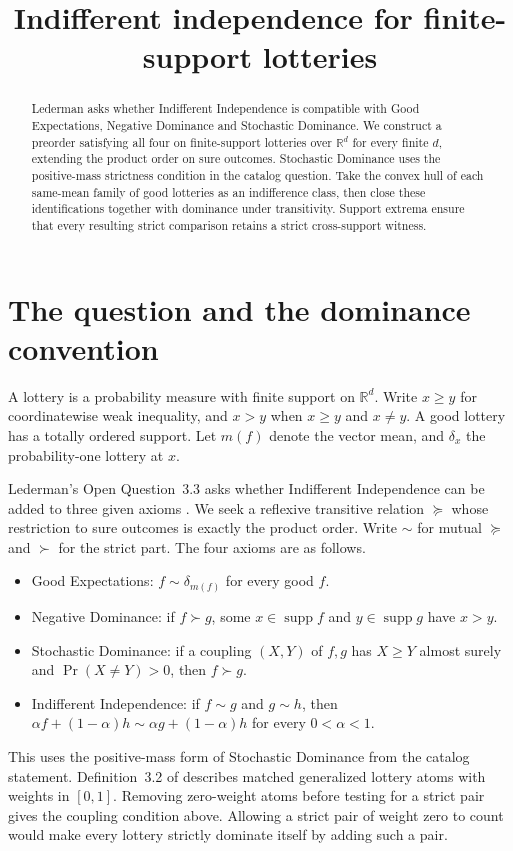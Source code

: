 \documentclass[11pt,a4paper]{amsart}
\title[Indifferent independence for lotteries]{Indifferent independence for finite-support lotteries}
\date{}
\newcommand{\R}{\mathbb R}
\newcommand{\supp}{\operatorname{supp}}
\begin{document}
\begin{abstract}
Lederman asks whether Indifferent Independence is compatible with Good Expectations, Negative Dominance and Stochastic Dominance. We construct a preorder satisfying all four on finite-support lotteries over $\R^d$ for every finite $d$, extending the product order on sure outcomes. Stochastic Dominance uses the positive-mass strictness condition in the catalog question. Take the convex hull of each same-mean family of good lotteries as an indifference class, then close these identifications together with dominance under transitivity. Support extrema ensure that every resulting strict comparison retains a strict cross-support witness.
\end{abstract}
\maketitle

\section{The question and the dominance convention}
A lottery is a probability measure with finite support on $\R^d$. Write $x\ge y$ for coordinatewise weak inequality, and $x>y$ when $x\ge y$ and $x\ne y$. A good lottery has a totally ordered support. Let $m(f)$ denote the vector mean, and $\delta_x$ the probability-one lottery at $x$.

Lederman's Open Question~3.3 asks whether Indifferent Independence can be added to three given axioms \cite[\S3, p.~26]{lederman}. We seek a reflexive transitive relation $\succeq$ whose restriction to sure outcomes is exactly the product order. Write $\sim$ for mutual $\succeq$ and $\succ$ for the strict part. The four axioms are as follows.
\begin{itemize}
\item Good Expectations: $f\sim\delta_{m(f)}$ for every good $f$.
\item Negative Dominance: if $f\succ g$, some $x\in\supp f$ and $y\in\supp g$ have $x>y$.
\item Stochastic Dominance: if a coupling $(X,Y)$ of $f,g$ has $X\ge Y$ almost surely and $\Pr(X\ne Y)>0$, then $f\succ g$.
\item Indifferent Independence: if $f\sim g$ and $g\sim h$, then $\alpha f+(1-\alpha)h\sim\alpha g+(1-\alpha)h$ for every $0<\alpha<1$.
\end{itemize}
This uses the positive-mass form of Stochastic Dominance from the catalog statement. Definition~3.2 of \cite{lederman} describes matched generalized lottery atoms with weights in $[0,1]$. Removing zero-weight atoms before testing for a strict pair gives the coupling condition above. Allowing a strict pair of weight zero to count would make every lottery strictly dominate itself by adding such a pair.
\end{document}
